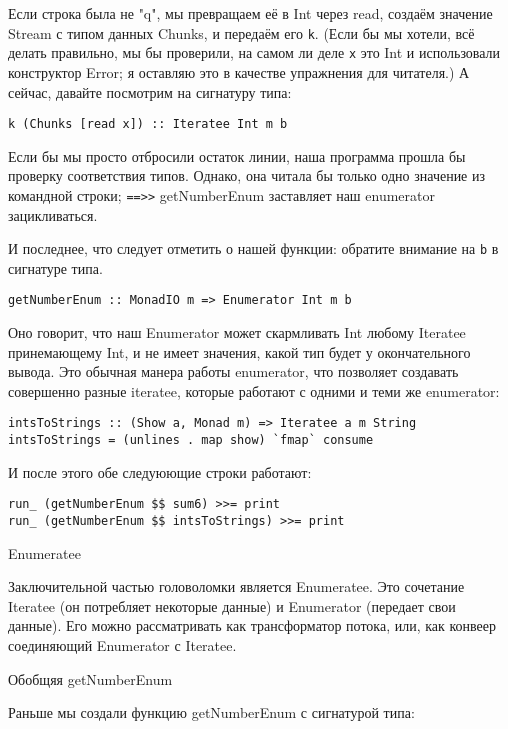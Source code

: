 Если строка была не "q", мы превращаем её в Int через read, создаём значение Stream с типом данных Chunks, и передаём его \lstinline'k'. (Если бы мы хотели, всё делать правильно, мы бы проверили, на самом ли деле \lstinline'x' это Int и использовали конструктор Error; я оставляю это в качестве упражнения для читателя.) А сейчас, давайте посмотрим на сигнатуру типа:

\begin{lstlisting}
k (Chunks [read x]) :: Iteratee Int m b
\end{lstlisting}

Если бы мы просто отбросили остаток линии, наша программа прошла бы проверку соответствия типов. Однако, она читала бы только одно значение из командной строки; \lstinline'==>>' getNumberEnum заставляет наш enumerator зацикливаться.

И последнее, что следует отметить о нашей функции: обратите внимание на \lstinline'b' в сигнатуре типа.

\begin{lstlisting}
getNumberEnum :: MonadIO m => Enumerator Int m b
\end{lstlisting}

Оно говорит, что наш Enumerator может скармливать Int любому Iteratee принемающему Int, и не имеет значения, какой тип будет у окончательного вывода. Это обычная манера работы enumerator, что позволяет создавать совершенно разные iteratee, которые работают с одними и теми же enumerator:

\begin{lstlisting}
intsToStrings :: (Show a, Monad m) => Iteratee a m String
intsToStrings = (unlines . map show) `fmap` consume
\end{lstlisting}

И после этого обе следуюющие строки работают:

\begin{lstlisting}
run_ (getNumberEnum $$ sum6) >>= print
run_ (getNumberEnum $$ intsToStrings) >>= print
\end{lstlisting}

Enumeratee

Заключительной частью головоломки является Enumeratee. Это сочетание Iteratee (он потребляет некоторые данные) и Enumerator (передает свои данные). Его можно рассматривать как трансформатор потока, или, как конвеер соединяющий Enumerator с Iteratee.

Обобщяя getNumberEnum

Раньше мы создали функцию getNumberEnum с сигнатурой типа:


